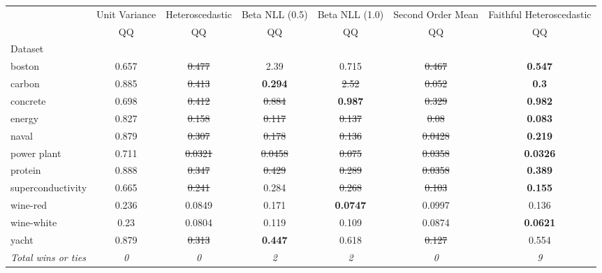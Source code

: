 \begin{tabular}{l|c|c|c|c|c|c}
\toprule
{} & {Unit Variance} & {Heteroscedastic} & {Beta NLL (0.5)} & {Beta NLL (1.0)} & {Second Order Mean} & {Faithful Heteroscedastic} \\
{} & {QQ} & {QQ} & {QQ} & {QQ} & {QQ} & {QQ} \\
{Dataset} & {} & {} & {} & {} & {} & {} \\
\midrule
boston & 0.657 & \sout{0.477} & 2.39 & 0.715 & \sout{0.467} & \textbf{0.547} \\
carbon & 0.885 & \sout{0.413} & \textbf{0.294} & \sout{2.52} & \sout{0.052} & \textbf{0.3} \\
concrete & 0.698 & \sout{0.412} & \sout{0.884} & \textbf{0.987} & \sout{0.329} & \textbf{0.982} \\
energy & 0.827 & \sout{0.158} & \sout{0.117} & \sout{0.137} & \sout{0.08} & \textbf{0.083} \\
naval & 0.879 & \sout{0.307} & \sout{0.178} & \sout{0.136} & \sout{0.0428} & \textbf{0.219} \\
power plant & 0.711 & \sout{0.0321} & \sout{0.0458} & \sout{0.075} & \sout{0.0358} & \textbf{0.0326} \\
protein & 0.888 & \sout{0.347} & \sout{0.429} & \sout{0.289} & \sout{0.0358} & \textbf{0.389} \\
superconductivity & 0.665 & \sout{0.241} & 0.284 & \sout{0.268} & \sout{0.103} & \textbf{0.155} \\
wine-red & 0.236 & 0.0849 & 0.171 & \textbf{0.0747} & 0.0997 & 0.136 \\
wine-white & 0.23 & 0.0804 & 0.119 & 0.109 & 0.0874 & \textbf{0.0621} \\
yacht & 0.879 & \sout{0.313} & \textbf{0.447} & 0.618 & \sout{0.127} & 0.554 \\
\textit{{Total wins or ties}} & \textit{0} & \textit{0} & \textit{2} & \textit{2} & \textit{0} & \textit{9} \\
\bottomrule
\end{tabular}

